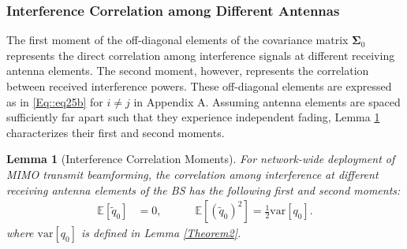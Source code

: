 \documentclass[12pt, draftclsnofoot, onecolumn]{IEEEtran}
\newtheorem{MomentsLemma}{Lemma}
\theoremstyle{plain}
\begin{document}
\subsubsection{Interference Correlation among Different Antennas}\label{offDiag}
The first moment of the off-diagonal elements of the covariance matrix $\boldsymbol{\Sigma}_{0}$ represents the direct correlation among interference signals at different receiving antenna elements. The second moment, however, represents  the correlation between received interference powers.   
These off-diagonal elements are expressed as in \eqref{Eq::eq25b} for $i\neq j$ in Appendix A. %
Assuming antenna elements are spaced sufficiently far apart such that they experience independent fading, %
Lemma \ref{offDlemma} characterizes their first and second moments.
\vspace{-.1in}
\begin{MomentsLemma}[Interference Correlation Moments]\label{offDlemma}
For network-wide deployment of MIMO transmit beamforming, the correlation among interference at different receiving antenna elements of the BS has the following first and second moments:
\begin{align}
\!\!\!\!\!\!\!\!\!\!\!\!\!\!\!\!\!\!\mathbb{E}\left[\tilde{\mathit{q}}_{0}\right]&=
0,\quad \quad \quad \mathbb{E}\left[(\tilde{\mathit{q}}_{0})^2\right]= \frac{1}{2} \text{var}\left[\mathit{q}_{0}\right].\label{var1}
\end{align}
where $\text{var}\left[\mathit{q}_{0}\right]$ is defined in Lemma \ref{Theorem2}.
\end{MomentsLemma}
\end{document}
